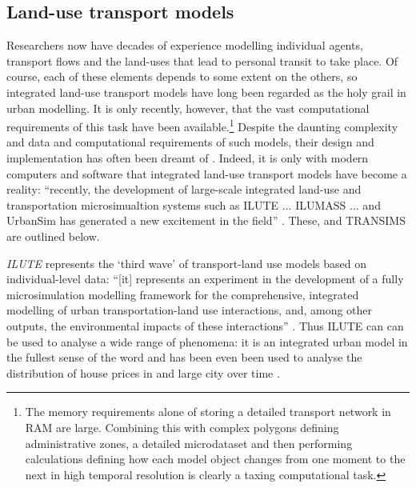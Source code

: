\subsection{Land-use transport models}
Researchers now have decades of experience modelling individual agents,
transport flows and the land-uses that lead to personal transit to take place.
Of course, each of these elements depends to some extent on the others, so
integrated land-use transport models have long been regarded as the holy grail
in urban modelling. It is only recently, however, that the vast computational
requirements of this task have been
available.\footnote{The memory requirements alone of storing a detailed
transport network in RAM are large. Combining this with complex polygons
defining administrative zones, a detailed microdataset and then performing
calculations defining how each model object changes from one moment to the next
in high temporal resolution is clearly a taxing computational task.
}
Despite the daunting complexity and data and computational requirements of such
models, their design and implementation has often been dreamt of
\citep{timmermans2003saga}. Indeed, it is only with modern computers and software
that integrated land-use transport models have become a reality: ``recently,
the development of large-scale integrated land-use and
transportation microsimualtion systems such as ILUTE ... ILUMASS
... and UrbanSim has generated a new excitement in the field'' \citep[p.~935]{Pinjari2011}.
These, and TRANSIMS are outlined below.


\emph{ILUTE}  represents the `third wave' of transport-land use
models based on individual-level data:
``[it] represents an experiment in the development of a
fully microsimulation modelling
framework for the comprehensive, integrated modelling of urban transportation-land use
interactions, and, among other outputs, the environmental impacts of these interactions''
\citep[p.~15]{timmermans2003saga}. Thus ILUTE can can be used to analyse a wide range
of phenomena: it is an integrated urban model in the fullest sense of the word
and has been even been used to analyse the distribution of house prices
in and large city over time \citep{Farooq2012-integreted}.

